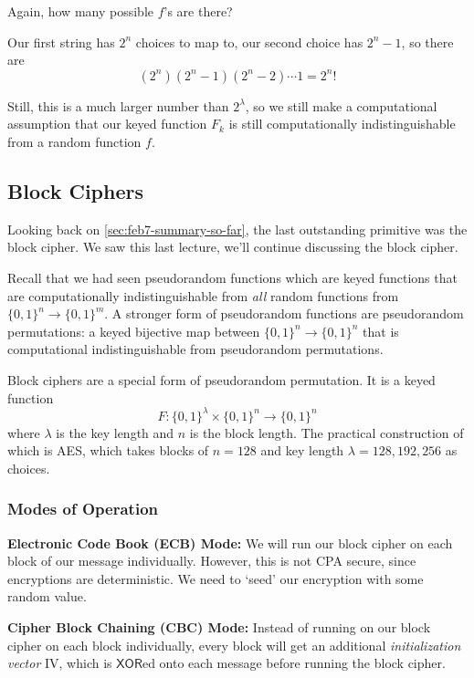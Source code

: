 
\begin{ques*}
    Again, how many possible $f$'s are there?
\end{ques*}
Our first string has $2^n$ choices to map to, our second choice has $2^n - 1$, so there are
\[(2^n)(2^n-1)(2^n-2)\cdots 1 = 2^n!\]

Still, this is a much larger number than $2^\lambda$, so we still make a computational assumption that our keyed function $F_k$ is still computationally indistinguishable from a random function $f$.

\subsection{Block Ciphers}
Looking back on \cref{sec:feb7-summary-so-far}, the last outstanding primitive was the block cipher. We saw this last lecture, we'll continue discussing the block cipher.

Recall that we had seen pseudorandom functions which are keyed functions that are computationally indistinguishable from \emph{all} random functions from $\{0, 1\}^n\to \{0, 1\}^m$. A stronger form of pseudorandom functions are pseudorandom permutations: a keyed bijective map between $\{0, 1\}^n\to \{0, 1\}^n$ that is computational indistinguishable from pseudorandom permutations.

Block ciphers are a special form of pseudorandom permutation. It is a keyed function
\[F : \{0, 1\}^\lambda\times \{0, 1\}^n\to \{0, 1\}^n\]
where $\lambda$ is the key length and $n$ is the block length. The practical construction of which is AES, which takes blocks of $n = 128$ and key length $\lambda = 128, 192, 256$ as choices.

\subsubsection{Modes of Operation}

\textbf{Electronic Code Book (ECB) Mode:} We will run our block cipher on each block of our message individually. However, this is not CPA secure, since encryptions are deterministic. We need to `seed' our encryption with some random value.

\textbf{Cipher Block Chaining (CBC) Mode:} Instead of running on our block cipher on each block individually, every block will get an additional \emph{initialization vector} IV, which is $\mathsf{XOR}$ed onto each message before running the block cipher.

